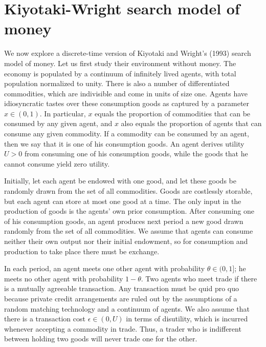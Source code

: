 \section{Kiyotaki-Wright search model of money}

We now explore a discrete-time version of Kiyotaki and Wright's (1993)
search model of money.
Let us first study their environment without money.
The economy is populated by a continuum of infinitely lived agents,
with total population normalized to unity. There is also a
number of differentiated commodities, which are indivisible and
come in units of size one.  Agents have idiosyncratic
tastes over these consumption goods as captured by a parameter
$x\in(0,1)$. In particular, $x$ equals the proportion of commodities
that can be consumed by any given agent, and $x$ also equals
the proportion of agents that can consume any given commodity. If a
commodity can be consumed by an agent, then we say that it is one of
his consumption goods. An
agent derives utility $U>0$ from consuming one of his consumption
goods, while the goods that he cannot consume yield zero utility.

Initially, let each agent be endowed with one good, and let these
goods be randomly drawn from the set of all commodities. Goods are
costlessly storable, but each agent can store at most
one good at a time. The only input in the production of goods
is the agents' own prior consumption. After consuming one of his
consumption goods, an agent produces next period a new good drawn
randomly from the set of all commodities. We assume that agents can
consume neither their own output nor their initial endowment, so
for consumption and production to take place there must be exchange.

In each period, an agent meets
one other agent with probability $\theta \in (0,1]$; he meets no other agent
with probability $1-\theta$. Two agents who meet  trade if there is
a mutually agreeable transaction. Any transaction must be quid pro quo
because private credit arrangements are ruled out by the assumptions of a
random matching technology and a continuum of agents.
We also assume that there is a transaction cost
$\epsilon \in (0, U)$ in terms of disutility, which is incurred
whenever accepting a commodity in trade. Thus, a trader who is indifferent
between holding two goods will never trade one for the other.

